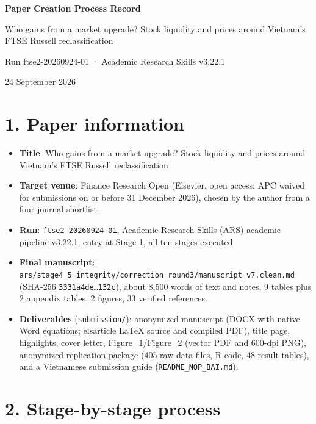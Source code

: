 \documentclass[12pt,a4paper]{article}
\providecommand{\tightlist}{\setlength{\itemsep}{0pt}\setlength{\parskip}{0pt}}
\begin{document}
\begin{titlepage}\centering\vspace*{5cm}
{\LARGE\bfseries Paper Creation Process Record\par}\vspace{1em}
{\large Who gains from a market upgrade? Stock liquidity and prices
around Vietnam's FTSE Russell reclassification\par}\vspace{2em}
{Run ftse2-20260924-01 · Academic Research Skills v3.22.1\par}\vspace{1em}
{24 September 2026\par}
\end{titlepage}
\tableofcontents\newpage
\small
\hypertarget{paper-information}{%
\section{1. Paper information}\label{paper-information}}

\begin{itemize}
\tightlist
\item
  \textbf{Title}: Who gains from a market upgrade? Stock liquidity and
  prices around Vietnam's FTSE Russell reclassification
\item
  \textbf{Target venue}: Finance Research Open (Elsevier, open access;
  APC waived for submissions on or before 31 December 2026), chosen by
  the author from a four-journal shortlist.
\item
  \textbf{Run}: \texttt{ftse2-20260924-01}, Academic Research Skills
  (ARS) academic-pipeline v3.22.1, entry at Stage 1, all ten stages
  executed.
\item
  \textbf{Final manuscript}:
  \texttt{ars/stage4\_5\_integrity/correction\_round3/manuscript\_v7.clean.md}
  (SHA-256 \texttt{3331a4de…132c}), about 8,500 words of text and notes,
  9 tables plus 2 appendix tables, 2 figures, 33 verified references.
\item
  \textbf{Deliverables} (\texttt{submission/}): anonymized manuscript
  (DOCX with native Word equations; elsarticle LaTeX source and compiled
  PDF), title page, highlights, cover letter, Figure\_1/Figure\_2
  (vector PDF and 600-dpi PNG), anonymized replication package (405 raw
  data files, R code, 48 result tables), and a Vietnamese submission
  guide (\texttt{README\_NOP\_BAI.md}).
\end{itemize}

\hypertarget{stage-by-stage-process}{%
\section{2. Stage-by-stage process}\label{stage-by-stage-process}}
\end{document}
